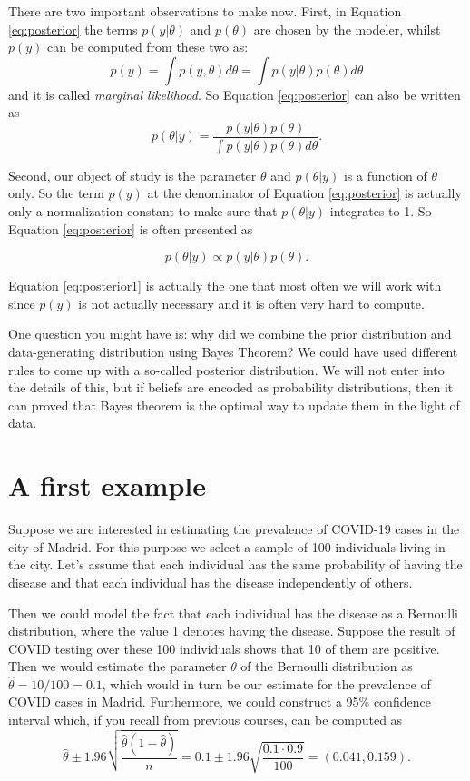 \documentclass[
]{book}
\begin{document}
There are two important observations to make now. First, in Equation \eqref{eq:posterior} the terms \(p(y|\theta)\) and \(p(\theta)\) are chosen by the modeler, whilst \(p(y)\) can be computed from these two as:
\[
p(y)=\int p(y,\theta)d\theta=\int p(y|\theta)p(\theta)d\theta
\]
and it is called \emph{marginal likelihood}. So Equation \eqref{eq:posterior} can also be written as
\[
p(\theta|y) = \frac{p(y|\theta)p(\theta)}{\int p(y|\theta)p(\theta)d\theta}.
\]

Second, our object of study is the parameter \(\theta\) and \(p(\theta|y)\) is a function of \(\theta\) only. So the term \(p(y)\) at the denominator of Equation \eqref{eq:posterior} is actually only a normalization constant to make sure that \(p(\theta|y)\) integrates to 1. So Equation \eqref{eq:posterior} is often presented as

\begin{equation}
 \label{eq:posterior1}
p(\theta|y)\propto p(y|\theta)p(\theta).
\end{equation}

Equation \eqref{eq:posterior1} is actually the one that most often we will work with since \(p(y)\) is not actually necessary and it is often very hard to compute.

One question you might have is: why did we combine the prior distribution and data-generating distribution using Bayes Theorem? We could have used different rules to come up with a so-called posterior distribution. We will not enter into the details of this, but if beliefs are encoded as probability distributions, then it can proved that Bayes theorem is the optimal way to update them in the light of data.

\hypertarget{a-first-example}{%
\section{A first example}\label{a-first-example}}

Suppose we are interested in estimating the prevalence of COVID-19 cases in the city of Madrid. For this purpose we select a sample of 100 individuals living in the city. Let's assume that each individual has the same probability of having the disease and that each individual has the disease independently of others.

Then we could model the fact that each individual has the disease as a Bernoulli distribution, where the value 1 denotes having the disease. Suppose the result of COVID testing over these 100 individuals shows that 10 of them are positive. Then we would estimate the parameter \(\theta\) of the Bernoulli distribution as \(\hat\theta=10/100=0.1\), which would in turn be our estimate for the prevalence of COVID cases in Madrid. Furthermore, we could construct a 95\% confidence interval which, if you recall from previous courses, can be computed as
\[
\hat\theta\pm 1.96 \sqrt{\frac{\hat\theta(1-\hat\theta)}{n}}= 0.1 \pm 1.96 \sqrt{\frac{0.1\cdot 0.9}{100}}= (0.041,0.159).
\]
\end{document}
